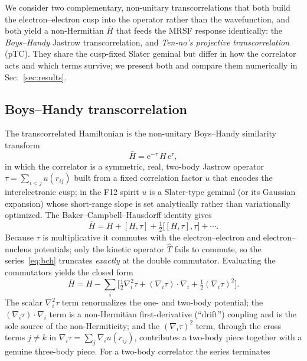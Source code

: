 \documentclass[aps,prb,reprint,superscriptaddress,floatfix]{revtex4-2}
\newcommand{\Hbar}{\bar{H}}
\newcommand{\op}[1]{\hat{#1}}
\newcommand{\ee}{\mathrm{e}}
\begin{document}
We consider two complementary, non-unitary transcorrelations that both build the
electron--electron cusp into the operator rather than the wavefunction, and both
yield a non-Hermitian $\Hbar$ that feeds the MRSF response identically: the
\emph{Boys--Handy} Jastrow transcorrelation, and \emph{Ten-no's projective
transcorrelation} (pTC). They share the cusp-fixed Slater geminal but differ in
how the correlator acts and which terms survive; we present both and compare them
numerically in Sec.~\ref{sec:results}.

\subsection{Boys--Handy transcorrelation}

The transcorrelated Hamiltonian is the non-unitary Boys--Handy similarity
transform~\cite{boys1969}
\begin{equation}
\Hbar=\ee^{-\tau}\,H\,\ee^{\tau},
\label{eq:tc}
\end{equation}
in which the correlator is a symmetric, real, two-body Jastrow operator
$\tau=\sum_{i<j}u(r_{ij})$ built from a fixed correlation factor $u$ that encodes
the interelectronic cusp; in the F12 spirit $u$ is a Slater-type geminal (or its
Gaussian expansion) whose short-range slope is set analytically rather than
variationally optimized. The Baker--Campbell--Hausdorff identity gives
\begin{equation}
\Hbar=H+[H,\tau]+\tfrac12\big[[H,\tau],\tau\big]+\cdots .
\label{eq:bch}
\end{equation}
Because $\tau$ is multiplicative it commutes with the electron--electron and
electron--nucleus potentials; only the kinetic operator $\op{T}$ fails to commute,
so the series~\eqref{eq:bch} truncates \emph{exactly} at the double commutator.
Evaluating the commutators yields the closed form
\begin{equation}
\Hbar=H-\sum_i\Big[\tfrac12\nabla_i^2\tau
+(\nabla_i\tau)\!\cdot\!\nabla_i
+\tfrac12(\nabla_i\tau)^2\Big].
\label{eq:hbar-explicit}
\end{equation}
The scalar $\nabla_i^2\tau$ term renormalizes the one- and two-body potential; the
$(\nabla_i\tau)\!\cdot\!\nabla_i$ term is a non-Hermitian first-derivative
(``drift'') coupling and is the sole source of the non-Hermiticity; and the
$(\nabla_i\tau)^2$ term, through the cross terms $j\neq k$ in
$\nabla_i\tau=\sum_j\nabla_i u(r_{ij})$, contributes a two-body piece together
with a genuine three-body piece. For a two-body correlator the series terminates
\end{document}
